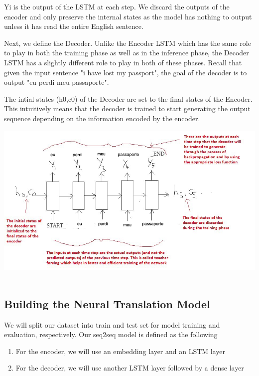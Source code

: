 \documentclass[runningheads]{llncs}
\begin{document}
 	Y{i} is the output of the LSTM at each step. We discard the outputs of the encoder and only preserve the internal states as the model has nothing to output unless it has read the entire English sentence.
	
	Next, we define the Decoder. Unlike the Encoder LSTM which has the same role to play in both the training phase as well as in the inference phase, the Decoder LSTM has a slightly different role to play in both of these phases. Recall that given the input sentence "i have lost my passport", the goal of the decoder is to output "eu perdi meu passaporte". 

	The intial states (h{0},c{0}) of the Decoder are set to the final states of the Encoder. This intuitively means that the decoder is trained to start generating the output sequence depending on the information encoded by the encoder.
	
	\begin{minipage}{\linewidth}
	 	\begin{center}
	 		\includegraphics[width=\linewidth]{decoder.jpeg}
	 		\label{fig:Decoder LSTM}~\cite{ref_url6}
	 	\end{center}
	 \end{minipage}
	 \afterpage{\clearpage}
	 
	\subsection{Building the Neural Translation Model}
	We will split our dataset into train and test set for model training and evaluation, respectively.
	Our seq2seq model is defined as the following

	\begin{enumerate}
		\item For the encoder, we will use an embedding layer and an LSTM layer
		\item For the decoder, we will use another LSTM layer followed by a dense layer
	\end{enumerate}
\end{document}
